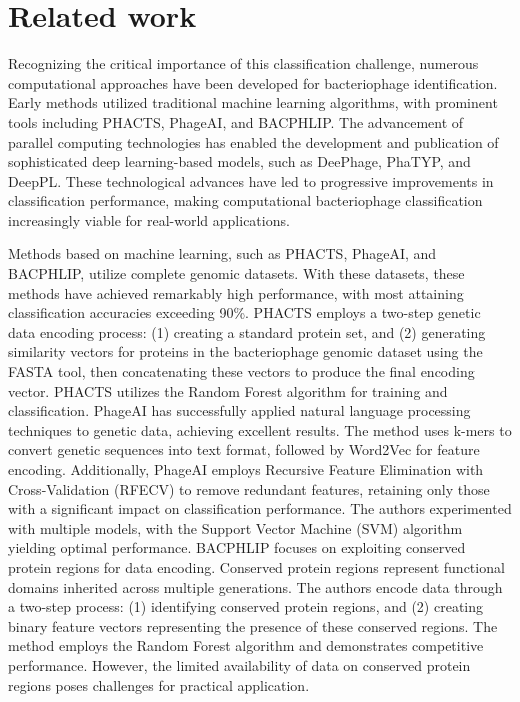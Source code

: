 \documentclass[runningheads]{llncs}
\begin{document}
\section{Related work} \label{related_works}
Recognizing the critical importance of this classification challenge, numerous computational approaches have been developed for bacteriophage identification. Early methods utilized traditional machine learning algorithms, with prominent tools including PHACTS\cite{mcnair2012phacts}, PhageAI\cite{tynecki2020phageai}, and BACPHLIP\cite{hockenberry2021bacphlip}. The advancement of parallel computing technologies has enabled the development and publication of sophisticated deep learning-based models, such as DeePhage\cite{wu2021deephage}, PhaTYP\cite{shang2023phatyp}, and DeepPL\cite{zhang2024deeppl}. These technological advances have led to progressive improvements in classification performance, making computational bacteriophage classification increasingly viable for real-world applications.

Methods based on machine learning, such as PHACTS\cite{mcnair2012phacts}, PhageAI\cite{tynecki2020phageai}, and BACPHLIP\cite{hockenberry2021bacphlip}, utilize complete genomic datasets. With these datasets, these methods have achieved remarkably high performance, with most attaining classification accuracies exceeding 90\%. PHACTS employs a two-step genetic data encoding process: (1) creating a standard protein set, and (2) generating similarity vectors for proteins in the bacteriophage genomic dataset using the FASTA tool, then concatenating these vectors to produce the final encoding vector. PHACTS\cite{mcnair2012phacts} utilizes the Random Forest algorithm for training and classification. PhageAI\cite{tynecki2020phageai} has successfully applied natural language processing techniques to genetic data, achieving excellent results. The method uses k-mers to convert genetic sequences into text format, followed by Word2Vec for feature encoding. Additionally, PhageAI\cite{tynecki2020phageai} employs Recursive Feature Elimination with Cross-Validation (RFECV) to remove redundant features, retaining only those with a significant impact on classification performance. The authors experimented with multiple models, with the Support Vector Machine (SVM) algorithm yielding optimal performance. BACPHLIP\cite{hockenberry2021bacphlip} focuses on exploiting conserved protein regions for data encoding. Conserved protein regions represent functional domains inherited across multiple generations. The authors encode data through a two-step process: (1) identifying conserved protein regions, and (2) creating binary feature vectors representing the presence of these conserved regions. The method employs the Random Forest algorithm and demonstrates competitive performance. However, the limited availability of data on conserved protein regions poses challenges for practical application.
\end{document}
